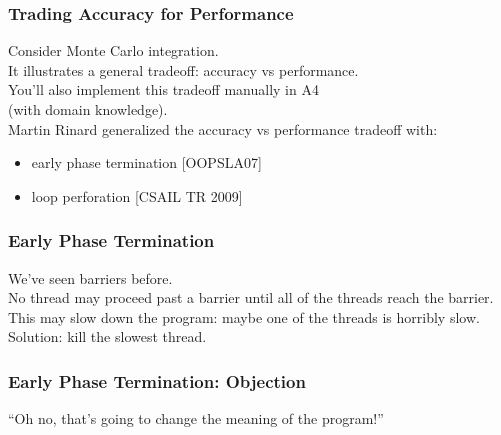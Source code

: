\documentclass[aspectratio=43]{beamer}
\newenvironment{changemargin}[1]{%
  \begin{list}{}{%
    \setlength{\topsep}{0pt}%
    \setlength{\leftmargin}{#1}%
    \setlength{\rightmargin}{1em}
    \setlength{\listparindent}{\parindent}%
    \setlength{\itemindent}{\parindent}%
    \setlength{\parsep}{\parskip}%
  }%
  \item[]}{\end{list}}
\begin{document}
\begin{frame}
  \frametitle{Trading Accuracy for Performance}

\begin{changemargin}{2cm}
    Consider Monte Carlo integration.\\
    It illustrates a general tradeoff: accuracy vs performance.\\
    You'll also implement this tradeoff manually in A4 \\ \qquad (with domain knowledge).\\[1em]

    Martin Rinard generalized the accuracy vs performance tradeoff with:
      \begin{itemize}
        \item early phase termination [OOPSLA07]
        \item loop perforation [CSAIL TR 2009]
      \end{itemize}
\end{changemargin}
\end{frame}


\begin{frame}
  \frametitle{Early Phase Termination}

\begin{changemargin}{2cm}

  We've seen barriers before.\\

  No thread may proceed past a barrier until all of the threads
reach the barrier.\\[1em]

  This may slow down the program: maybe one of the threads is horribly
  slow.\\[1em]

  Solution: kill the slowest thread.

\end{changemargin}
\end{frame}

\begin{frame}
  \frametitle{Early Phase Termination: Objection}

\Huge
\begin{center}
``Oh no, that's going to change the meaning of the program!''
\end{center}
\end{frame}
\end{document}

